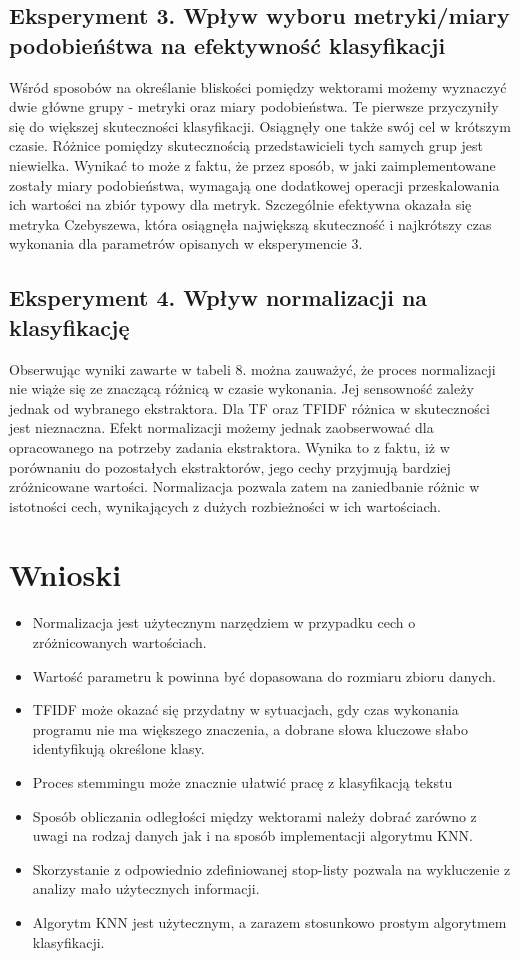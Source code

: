 \documentclass{classrep}
\begin{document}
\subsection{Eksperyment 3. Wpływ wyboru metryki/miary podobieńśtwa na efektywność klasyfikacji}
Wśród sposobów na określanie bliskości pomiędzy wektorami możemy wyznaczyć dwie główne grupy - metryki oraz miary podobieństwa. Te pierwsze przyczyniły się do większej skuteczności klasyfikacji. Osiągnęły one także swój cel w krótszym czasie. Różnice pomiędzy skutecznością przedstawicieli tych samych grup jest niewielka. Wynikać to może z faktu, że przez sposób, w jaki zaimplementowane zostały miary podobieństwa, wymagają one dodatkowej operacji przeskalowania ich wartości na zbiór typowy dla metryk. Szczególnie efektywna okazała się metryka Czebyszewa, która osiągnęła największą skuteczność i najkrótszy czas wykonania dla parametrów opisanych w eksperymencie 3. 
\subsection{Eksperyment 4. Wpływ normalizacji na klasyfikację}
Obserwując wyniki zawarte w tabeli 8. można zauważyć, że proces normalizacji nie wiąże się ze znaczącą różnicą w czasie wykonania. Jej sensowność zależy jednak od wybranego ekstraktora. Dla TF oraz TFIDF różnica w skuteczności jest nieznaczna. Efekt normalizacji możemy jednak zaobserwować dla opracowanego na potrzeby zadania ekstraktora. Wynika to z faktu, iż w porównaniu do pozostałych ekstraktorów, jego cechy przyjmują bardziej zróżnicowane wartości. Normalizacja pozwala zatem na zaniedbanie różnic w istotności cech, wynikających z dużych rozbieżności w ich wartościach.
\section{Wnioski}
\begin{itemize}
	\item Normalizacja jest użytecznym narzędziem w przypadku cech o zróżnicowanych wartościach.
	\item Wartość parametru k powinna być dopasowana do rozmiaru zbioru danych.
	\item TFIDF może okazać się przydatny w sytuacjach, gdy czas wykonania programu nie ma większego znaczenia, a dobrane słowa kluczowe słabo identyfikują określone klasy.
	\item Proces stemmingu może znacznie ułatwić pracę z klasyfikacją tekstu
	\item Sposób obliczania odległości między wektorami należy dobrać zarówno z uwagi na rodzaj danych jak i na sposób implementacji algorytmu KNN.
	\item Skorzystanie z odpowiednio zdefiniowanej stop-listy pozwala na wykluczenie z analizy mało użytecznych informacji.
	\item Algorytm KNN jest użytecznym, a zarazem stosunkowo prostym algorytmem klasyfikacji.
\end{itemize}
\end{document}
